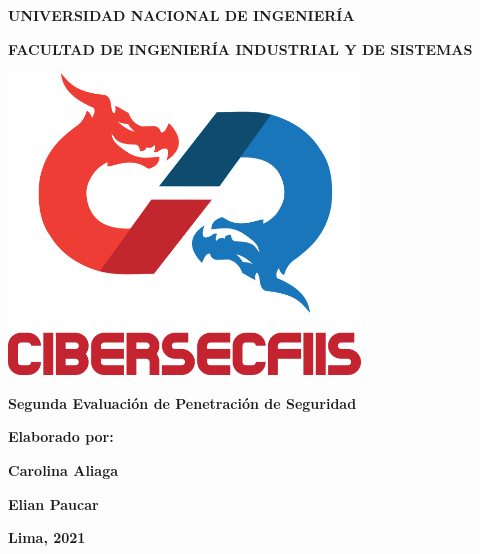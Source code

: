 \begin{titlepage}
    \centering
        {\large \textbf{UNIVERSIDAD NACIONAL DE INGENIERÍA}} \par \vspace{0.3cm}
        {\large \textbf{FACULTAD DE INGENIERÍA INDUSTRIAL Y DE SISTEMAS}} \par \vspace{1.125cm}
        \includegraphics[width=0.7\textwidth]{imagenes/CiberSecFIIS.png} \par \vspace{1.125cm}
        {\LARGE \textbf{Segunda Evaluación de Penetración de Seguridad}}\par \vspace{1cm}
        {\Large \textbf{Elaborado por:}} \par \vspace{1cm}
        \vfill
        {\large \textbf{Carolina Aliaga}} \par \vspace{0.8cm}
        {\large \textbf{Elian Paucar}} \par \vspace{3.55cm}
        \vfill
        {\textbf{Lima, 2021}}
\end{titlepage}
